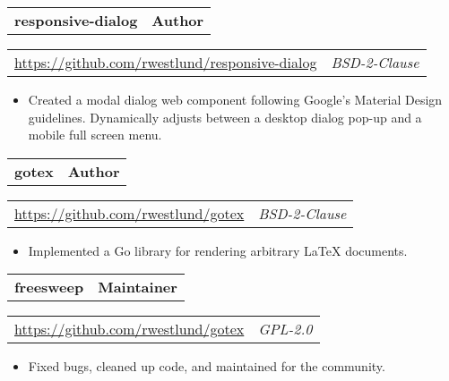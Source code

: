 \documentclass[10pt,letterpaper]{article}
\newcommand{\headerrow}[2]{%
    \begin{tabularx}{\linewidth}{Xr}
	    #1 & #2 \\
    \end{tabularx}
}
\begin{document}
    \headerrow{\textbf{responsive-dialog}}{\textbf{Author}}
    \headerrow{\url{https://github.com/rwestlund/responsive-dialog}}{\textit{BSD-2-Clause}}
    \begin{itemize}[label=--]
        \item Created a modal dialog web component following Google's Material
            Design guidelines.  Dynamically adjusts between a desktop dialog
            pop-up and a mobile full screen menu.
    \end{itemize}

    \headerrow{\textbf{gotex}}{\textbf{Author}}
    \headerrow{\url{https://github.com/rwestlund/gotex}}{\textit{BSD-2-Clause}}
    \begin{itemize}[label=--]
        \item Implemented a Go library for rendering arbitrary LaTeX documents.
    \end{itemize}

    \headerrow{\textbf{freesweep}}{\textbf{Maintainer}}
    \headerrow{\url{https://github.com/rwestlund/gotex}}{\textit{GPL-2.0}}
    \begin{itemize}[label=--]
        \item Fixed bugs, cleaned up code, and maintained for the community.
    \end{itemize}
\end{document}

